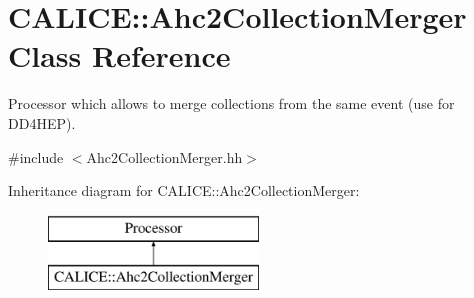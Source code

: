 \section{C\-A\-L\-I\-C\-E\-:\-:Ahc2\-Collection\-Merger Class Reference}
\label{classCALICE_1_1Ahc2CollectionMerger}


Processor which allows to merge collections from the same event (use for D\-D4\-H\-E\-P).  




{\ttfamily \#include $<$Ahc2\-Collection\-Merger.\-hh$>$}

Inheritance diagram for C\-A\-L\-I\-C\-E\-:\-:Ahc2\-Collection\-Merger\-:\begin{figure}[H]
\begin{center}
\leavevmode
\includegraphics[height=2.000000cm]{classCALICE_1_1Ahc2CollectionMerger}
\end{center}
\end{figure}
